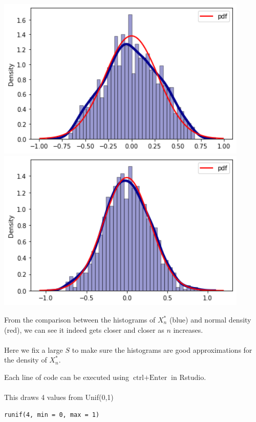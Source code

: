 \begin{Solution}{1.29}
 \begin{minipage}{0.45\textwidth}
 	\includegraphics[width=0.9\textwidth]{1n2} 
 	\includegraphics[width=0.9\textwidth]{1n20} 
 \end{minipage}
 \begin{minipage}[b]{0.45\textwidth}
 	From the comparison between the histograms of $X^*_n$ (blue) and normal density (red), we can see it indeed gets closer and closer as $n$ increases. \\~\\
 	Here we fix a large $S$ to make sure the histograms are good approximations for the density of $X_n^*$.
 \end{minipage}
\newline
Each line of code can be executed using $\text{ctrl}+\text{Enter}$ in Rstudio.
~\\~\\
This draws 4 values from Unif(0,1)
\begin{verbatim}
runif(4, min = 0, max = 1)
\end{verbatim}

\end{Solution}
